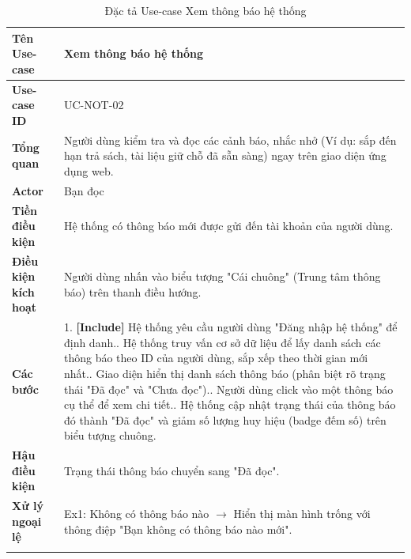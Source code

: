 \newpage
\begin{longtable}{|p{3.5cm}|p{11.5cm}|}
    \hline
    \textbf{Tên Use-case} & \textbf{Xem thông báo hệ thống} \\
    \hline
    \textbf{Use-case ID} & UC-NOT-02 \\
    \hline
    \textbf{Tổng quan} & Người dùng kiểm tra và đọc các cảnh báo, nhắc nhở (Ví dụ: sắp đến hạn trả sách, tài liệu giữ chỗ đã sẵn sàng) ngay trên giao diện ứng dụng web. \\
    \hline
    \textbf{Actor} & Bạn đọc \\
    \hline
    \textbf{Tiền điều kiện} & Hệ thống có thông báo mới được gửi đến tài khoản của người dùng. \\
    \hline
    \textbf{Điều kiện kích hoạt} & Người dùng nhấn vào biểu tượng "Cái chuông" (Trung tâm thông báo) trên thanh điều hướng. \\
    \hline
    \textbf{Các bước} & 
    1. \textbf{[Include]} Hệ thống yêu cầu người dùng "Đăng nhập hệ thống" để định danh.\newline
    2. Hệ thống truy vấn cơ sở dữ liệu để lấy danh sách các thông báo theo ID của người dùng, sắp xếp theo thời gian mới nhất.\newline
    3. Giao diện hiển thị danh sách thông báo (phân biệt rõ trạng thái "Đã đọc" và "Chưa đọc").\newline
    4. Người dùng click vào một thông báo cụ thể để xem chi tiết.\newline
    5. Hệ thống cập nhật trạng thái của thông báo đó thành "Đã đọc" và giảm số lượng huy hiệu (badge đếm số) trên biểu tượng chuông. \\
    \hline
    \textbf{Hậu điều kiện} & Trạng thái thông báo chuyển sang "Đã đọc". \\
    \hline
    \textbf{Xử lý ngoại lệ} & 
    Ex1: Không có thông báo nào $\rightarrow$ Hiển thị màn hình trống với thông điệp "Bạn không có thông báo nào mới". \\
    \hline
    \caption{Đặc tả Use-case Xem thông báo hệ thống}
\end{longtable}

